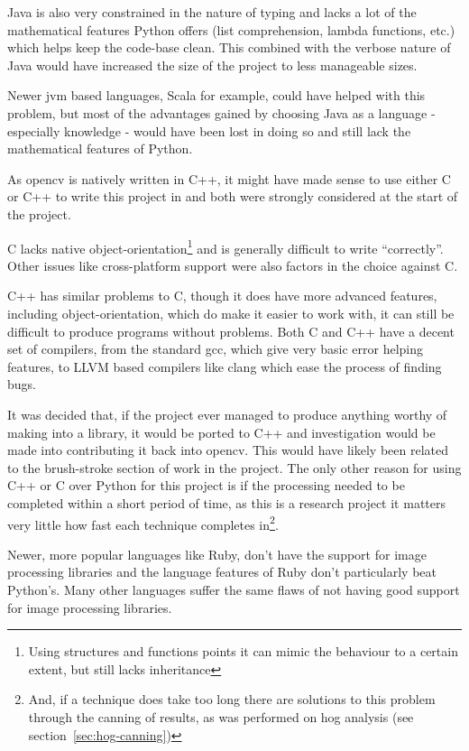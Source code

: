 Java is also very constrained in the nature of typing and lacks a lot of the mathematical features
Python offers (list comprehension, lambda functions, etc.) which helps keep the code-base clean.
This combined with the verbose nature of Java would have increased the size of the project to
less manageable sizes.

Newer \gls{jvm} based languages, Scala for example, could have helped with this problem, but most
of the advantages gained by choosing Java as a language - especially knowledge - would have been
lost in doing so and still lack the mathematical features of Python.

As \gls{opencv} is natively written in C++, it might have made sense to use either C or C++ to write 
this project in and both were strongly considered at the start of the project.

C lacks native object-orientation\footnote{Using structures and functions points it can mimic the 
behaviour to a certain extent, but still lacks inheritance} and is generally difficult to write 
``correctly''. Other issues like cross-platform support were also factors in the choice against C.

C++ has similar problems to C, though it does have more advanced features, including 
object-orientation, which do make it easier to work with, it can still be difficult to produce 
programs without problems. Both C and C++ have a decent set of compilers, from the standard 
\gls{gcc}, which give very basic error helping features, to LLVM based compilers like clang which 
ease the process of finding bugs.

It was decided that, if the project ever managed to produce anything worthy of making into a
library, it would be ported to C++ and investigation would be made into contributing it back into
\gls{opencv}. This would have likely been related to the brush-stroke section of work in the project. 
The only other reason for using C++ or C over Python for this project is if the processing needed
to be completed within a short period of time, as this is a research project it matters very 
little how fast each technique completes in\footnote{And, if a technique does take too long there 
are solutions to this problem through the canning of results, as was performed on \gls{hog} 
analysis (see section~\ref{sec:hog-canning})}.

Newer, more popular languages like Ruby, don't have the support for image processing libraries and
the language features of Ruby don't particularly beat Python's. Many other languages suffer the
same flaws of not having good support for image processing libraries.

